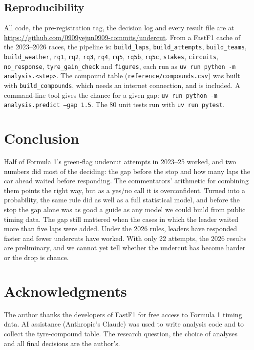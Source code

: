 \documentclass[12pt]{article}
\begin{document}
\subsection{Reproducibility}
All code, the pre-registration tag, the decision log and every result file are at \url{https://github.com/0909yejun0909-commits/undercut}. From a FastF1 cache of the 2023--2026 races, the pipeline is: \texttt{build\_laps}, \texttt{build\_attempts}, \texttt{build\_teams}, \texttt{build\_weather}, \texttt{rq1}, \texttt{rq2}, \texttt{rq3}, \texttt{rq4}, \texttt{rq5}, \texttt{rq5b}, \texttt{rq5c}, \texttt{stakes}, \texttt{circuits}, \texttt{no\_response}, \texttt{tyre\_gain\_check} and \texttt{figures}, each run as \texttt{uv run python -m analysis.<step>}. The compound table (\texttt{reference/compounds.csv}) was built with \texttt{build\_compounds}, which needs an internet connection, and is included. A command-line tool gives the chance for a given gap: \texttt{uv run python -m analysis.predict --gap 1.5}. The 80 unit tests run with \texttt{uv run pytest}.

\section{Conclusion}
Half of Formula 1's green-flag undercut attempts in 2023--25 worked, and two numbers did most of the deciding: the gap before the stop and how many laps the car ahead waited before responding. The commentators' arithmetic for combining them points the right way, but as a yes/no call it is overconfident. Turned into a probability, the same rule did as well as a full statistical model, and before the stop the gap alone was as good a guide as any model we could build from public timing data. The gap still mattered when the cases in which the leader waited more than five laps were added. Under the 2026 rules, leaders have responded faster and fewer undercuts have worked. With only 22 attempts, the 2026 results are preliminary, and we cannot yet tell whether the undercut has become harder or the drop is chance.

\section*{Acknowledgments}
The author thanks the developers of FastF1 for free access to Formula 1 timing data. AI assistance (Anthropic's Claude) was used to write analysis code and to collect the tyre-compound table. The research question, the choice of analyses and all final decisions are the author's.


\end{document}
